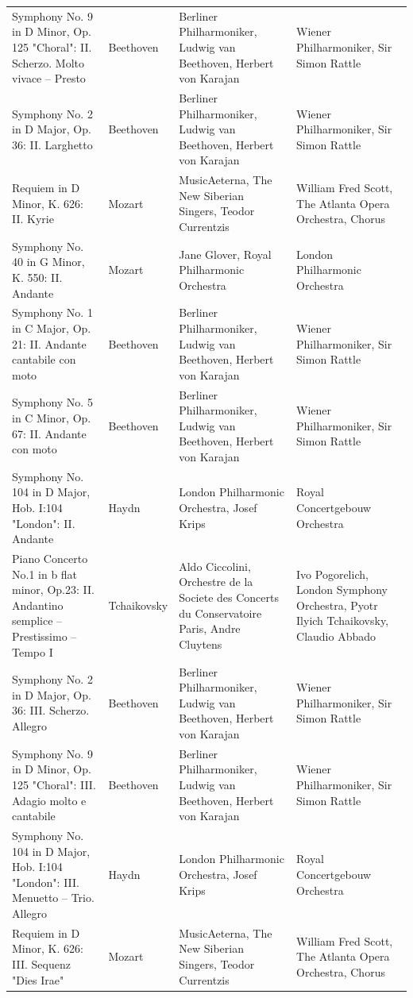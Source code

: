 \begin{longtable}{p{} p{} p{} p{}}
Symphony No. 9 in D Minor, Op. 125 "Choral": II. Scherzo. Molto vivace – Presto & Beethoven & Berliner Philharmoniker, Ludwig van Beethoven, Herbert von Karajan & Wiener Philharmoniker, Sir Simon Rattle \\
Symphony No. 2 in D Major, Op. 36: II. Larghetto & Beethoven & Berliner Philharmoniker, Ludwig van Beethoven, Herbert von Karajan & Wiener Philharmoniker, Sir Simon Rattle \\
Requiem in D Minor, K. 626: II. Kyrie & Mozart & MusicAeterna, The New Siberian Singers, Teodor Currentzis & William Fred Scott, The Atlanta Opera Orchestra, Chorus \\
Symphony No. 40 in G Minor, K. 550: II. Andante & Mozart & Jane Glover, Royal Philharmonic Orchestra & London Philharmonic Orchestra \\
Symphony No. 1 in C Major, Op. 21: II. Andante cantabile con moto & Beethoven & Berliner Philharmoniker, Ludwig van Beethoven, Herbert von Karajan & Wiener Philharmoniker, Sir Simon Rattle \\
Symphony No. 5 in C Minor, Op. 67: II. Andante con moto & Beethoven & Berliner Philharmoniker, Ludwig van Beethoven, Herbert von Karajan & Wiener Philharmoniker, Sir Simon Rattle \\
Symphony No. 104 in D Major, Hob. I:104 "London": II. Andante & Haydn & London Philharmonic Orchestra, Josef Krips & Royal Concertgebouw Orchestra \\
Piano Concerto No.1 in b flat minor, Op.23: II. Andantino semplice – Prestissimo – Tempo I & Tchaikovsky & Aldo Ciccolini, Orchestre de la Societe des Concerts du Conservatoire Paris, Andre Cluytens & Ivo Pogorelich, London Symphony Orchestra, Pyotr Ilyich Tchaikovsky, Claudio Abbado \\
Symphony No. 2 in D Major, Op. 36: III. Scherzo. Allegro & Beethoven & Berliner Philharmoniker, Ludwig van Beethoven, Herbert von Karajan & Wiener Philharmoniker, Sir Simon Rattle \\
Symphony No. 9 in D Minor, Op. 125 "Choral": III. Adagio molto e cantabile & Beethoven & Berliner Philharmoniker, Ludwig van Beethoven, Herbert von Karajan & Wiener Philharmoniker, Sir Simon Rattle \\
Symphony No. 104 in D Major, Hob. I:104 "London": III. Menuetto – Trio. Allegro & Haydn & London Philharmonic Orchestra, Josef Krips & Royal Concertgebouw Orchestra \\
Requiem in D Minor, K. 626: III. Sequenz "Dies Irae" & Mozart & MusicAeterna, The New Siberian Singers, Teodor Currentzis & William Fred Scott, The Atlanta Opera Orchestra, Chorus \\

\end{longtable}
